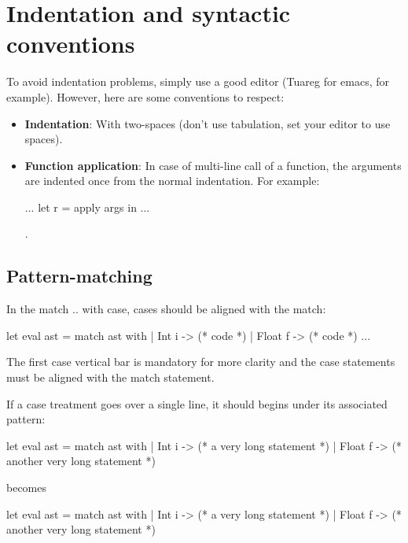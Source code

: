 \documentclass[12pt,a4paper]{article}
\begin{document}
\section{Indentation and syntactic conventions}

To avoid indentation problems, simply use a good editor (Tuareg for emacs, for
example). However, here are some conventions to respect:

\begin{itemize}
\item \textbf{Indentation}: With two-spaces (don't use tabulation, set your
  editor to use spaces).
\item \textbf{Function application}: In case of multi-line call of a function,
  the arguments are indented once from the normal indentation. For example:
  \begin{OCaml}
    ...
    let r = apply
      args in
    ...
  \end{OCaml}.
\end{itemize}

\subsection*{Pattern-matching}

In the \textsf{match .. with} case, cases should be aligned with the
\textsf{match}:

\begin{OCaml}
let eval ast =
  match ast with
  | Int i -> (* code *)
  | Float f -> (* code *)
  ...
\end{OCaml}

\noindent
The first case vertical bar is mandatory for more clarity and the case statements must be aligned with the match statement.
\newline

\noindent
If a case treatment goes over a single line, it should begins under its associated pattern:

\begin{OCaml}
let eval ast =
  match ast with
  | Int i -> (* a very long
    statement *)
  | Float f -> (* another very
    long statement *)
\end{OCaml}

becomes

\begin{OCaml}
let eval ast =
  match ast with
  | Int i ->
    (* a very long
    statement *)
  | Float f ->
    (* another very
    long statement *)
\end{OCaml}
\end{document}
